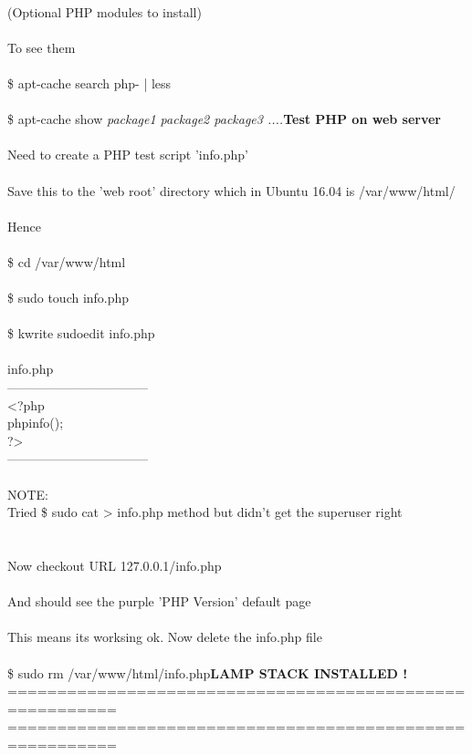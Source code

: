 \documentclass[10pt,a4paper]{article}
\begin{document}
{{{{{{{{{{{{{{{{{{\\
(Optional PHP modules to install)\\
\\
To see them\\
\\
\$ apt-cache search php- | less\\
\\
\$ apt-cache show \textit{package1 package2 package3 ....}}{\large \textbf{Test PHP on web server}}{\large \\
\\
Need to create a PHP test script 'info.php'\\
\\
Save this to the 'web root' directory which in Ubuntu 16.04 is /var/www/html/}{\large \\
\\
Hence\\
\\
\$ cd /var/www/html}{\large  \\
\\
\$ sudo touch info.php\\
\\
\$ kwrite sudoedit info.php\\
\\
info.php\\
---------------------------------\\
<?php \\
phpinfo();\\
?>\\
---------------------------------\\
\\
NOTE:\\
Tried \$ sudo cat > info.php   method but didn't get the superuser right\\
\\
\\
Now checkout URL  127.0.0.1/info.php  \\
\\
And should see the purple 'PHP Version' default page\\
\\
This means its worksing ok. Now delete the info.php file\\
\\
\$ sudo rm /var/www/html/info.php}{\large }\textbf{{\Large LAMP STACK INSTALLED !}}{\large \\
=========================================================\\
=========================================================\\
}}}}}}}}}}}}}}}}}}
\end{document}
